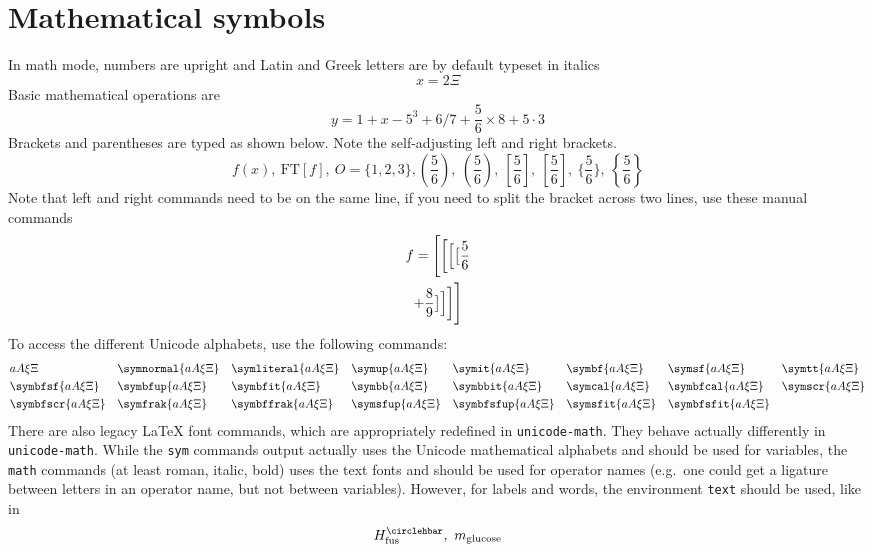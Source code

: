 \documentclass[11pt]{article}
\begin{document}
\section{Mathematical symbols}
In math mode, numbers are upright and Latin and Greek letters are by default typeset in italics
\[
x=2\Xi
\]
Basic mathematical operations are
\[
y = 1 + x - 5^3 + 6/7 + \frac{5}{6} \times 8 + 5 \cdot 3
\]
Brackets and parentheses are typed as shown below. Note the self-adjusting left and right brackets.
\[
f(x),\ \mathrm{FT}[f],\ O = \{1,2,3\}, (\frac{5}{6}),\ \left(\frac{5}{6}\right),\ [\frac{5}{6}],\ \left[\frac{5}{6}\right],\ \{\frac{5}{6}\},\ \left\{\frac{5}{6}\right\}
\]
Note that left and right commands need to be on the same line, if you need to split the bracket across two lines, use these manual commands
\begin{multline}
    f = \Biggl[  \biggl[ \Bigl[ \bigl[ \frac{5}{6}\\
    + \frac{8}{9} \bigr] \Bigr] \biggr] \Biggr]
\end{multline}
To access the different Unicode alphabets, use the following commands:
\begin{align*}
    &a A \xi \Xi                &
    &\symnormal{a A \xi \Xi}    &
    &\symliteral{a A \xi \Xi}   &
    &\symup{a A \xi \Xi}    & 
    &\symit{a A \xi \Xi}    &
    &\symbf{a A \xi \Xi}   &
    &\symsf{a A \xi \Xi}    &
    &\symtt{a A \xi \Xi}    \\
    &\symbfsf{a A \xi \Xi}   &
    &\symbfup{a A \xi \Xi}   &
    &\symbfit{a A \xi \Xi}   &
    &\symbb{a A \xi \Xi}   &
    &\symbbit{a A \xi \Xi}   &
    &\symcal{a A \xi \Xi}   &
    &\symbfcal{a A \xi \Xi}   &
    &\symscr{a A \xi \Xi}    \\
    &\symbfscr{a A \xi \Xi}   &
    &\symfrak{a A \xi \Xi}   &
    &\symbffrak{a A \xi \Xi}   &
    &\symsfup{a A \xi \Xi}   &
    &\symbfsfup{a A \xi \Xi}    &
    &\symsfit{a A \xi \Xi}    &
    &\symbfsfit{a A \xi \Xi} \\
\end{align*}
There are also legacy \LaTeX{} font commands, which are appropriately redefined in \texttt{unicode-math}. They behave actually differently in \texttt{unicode-math}. While the \texttt{sym} commands output actually uses the Unicode mathematical alphabets and should be used for variables, the \texttt{math} commands (at least roman, italic, bold) uses the text fonts and should be used for operator names (e.g.\ one could get a ligature between letters in an operator name, but not between variables). However, for labels and words, the environment \texttt{text} should be used, like in
\[
H_\text{fus}^\std,\ m_\text{glucose}
\]
\end{document}
